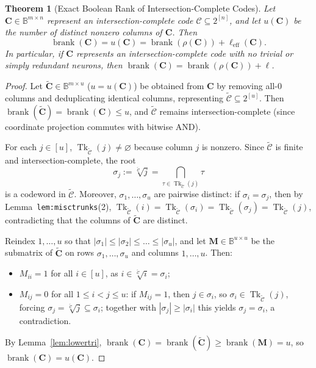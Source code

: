 \documentclass[11pt]{article}
\theoremstyle{plain}
\newtheorem{theorem}{Theorem}[section]
\theoremstyle{definition}
\theoremstyle{remark}
\DeclareMathOperator{\brank}{brank}
\DeclareMathOperator{\Tk}{Tk}
\begin{document}
\begin{theorem}[Exact Boolean Rank of Intersection-Complete Codes]\label{thm:intcomplete}
Let $\mathbf{C} \in \mathbb{B}^{m \times n}$ represent an intersection-complete code $\mathcal{C} \subseteq 2^{[n]}$, and let $u(\mathbf{C})$ be the number of distinct nonzero columns of $\mathbf{C}$. Then
\[
\brank(\mathbf{C}) = u(\mathbf{C}) = \brank(\rho(\mathbf{C})) + \ell_{\mathrm{eff}}(\mathbf{C}).
\]
In particular, if $\mathbf{C}$ represents an intersection-complete code with no trivial or simply redundant neurons, then $\brank(\mathbf{C}) = \brank(\rho(\mathbf{C})) + \ell$.
\end{theorem}

\begin{proof}
Let $\tilde{\mathbf{C}} \in \mathbb{B}^{m \times u}$ ($u = u(\mathbf{C})$) be obtained from $\mathbf{C}$ by removing all-$0$ columns and deduplicating identical columns, representing $\tilde{\mathcal{C}} \subseteq 2^{[u]}$. Then $\brank(\tilde{\mathbf{C}}) = \brank(\mathbf{C}) \le u$, and $\tilde{\mathcal{C}}$ remains intersection-complete (since coordinate projection commutes with bitwise AND).

For each $j \in [u]$, $\Tk_{\tilde{\mathcal{C}}}(j) \neq \varnothing$ because column $j$ is nonzero. Since $\tilde{\mathcal{C}}$ is finite and intersection-complete, the root
\[
\sigma_j := \sqrt[\tilde{\mathcal{C}}]{j} = \bigcap_{\tau \in \Tk_{\tilde{\mathcal{C}}}(j)} \tau
\]
is a codeword in $\tilde{\mathcal{C}}$. Moreover, $\sigma_1, \dots, \sigma_u$ are pairwise distinct: if $\sigma_i = \sigma_j$, then by Lemma~\texttt{lem:\allowbreak misctrunks}(2), $\Tk_{\tilde{\mathcal{C}}}(i) = \Tk_{\tilde{\mathcal{C}}}(\sigma_i) = \Tk_{\tilde{\mathcal{C}}}(\sigma_j) = \Tk_{\tilde{\mathcal{C}}}(j)$, contradicting that the columns of $\tilde{\mathbf{C}}$ are distinct.

Reindex $1, \dots, u$ so that $|\sigma_1| \le |\sigma_2| \le \dots \le |\sigma_u|$, and let $\mathbf{M} \in \mathbb{B}^{u \times u}$ be the submatrix of $\tilde{\mathbf{C}}$ on rows $\sigma_1, \dots, \sigma_u$ and columns $1, \dots, u$. Then:
\begin{itemize}[leftmargin=2em]
\item $M_{ii} = 1$ for all $i \in [u]$, as $i \in \sqrt[\tilde{\mathcal{C}}]{i} = \sigma_i$;
\item $M_{ij} = 0$ for all $1 \le i < j \le u$: if $M_{ij} = 1$, then $j \in \sigma_i$, so $\sigma_i \in \Tk_{\tilde{\mathcal{C}}}(j)$, forcing $\sigma_j = \sqrt[\tilde{\mathcal{C}}]{j} \subseteq \sigma_i$; together with $|\sigma_j| \ge |\sigma_i|$ this yields $\sigma_j = \sigma_i$, a contradiction.
\end{itemize}
By Lemma~\ref{lem:lowertri}, $\brank(\mathbf{C}) = \brank(\tilde{\mathbf{C}}) \ge \brank(\mathbf{M}) = u$, so $\brank(\mathbf{C}) = u(\mathbf{C})$.


\end{proof}
\end{document}
